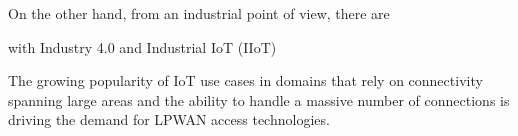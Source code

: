 		
		On the other hand, from an industrial point of view, there are 
		
		
		with Industry 4.0 and Industrial IoT (IIoT)
		
		The growing popularity of IoT use cases in domains that rely on connectivity spanning large areas and the ability to handle a massive number of connections is driving the demand for LPWAN access technologies. 
		
%		
%		
%		
%		
%		
%		
%		
%		
%			
%		
%		

